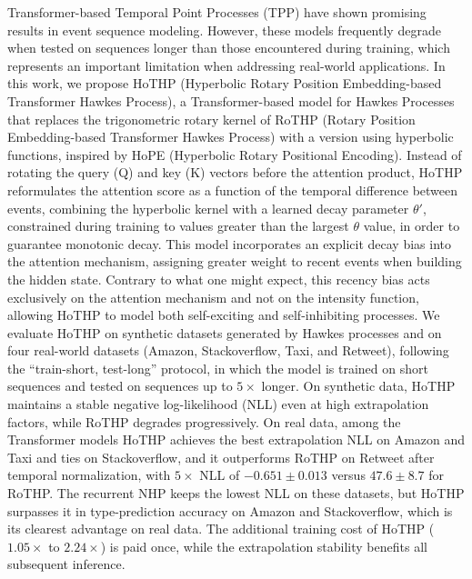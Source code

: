 Transformer-based Temporal Point Processes (\gls{TPP}) have shown promising results in event sequence modeling. However, these models frequently degrade when tested on sequences longer than those encountered during training, which represents an important limitation when addressing real-world applications. In this work, we propose HoTHP (Hyperbolic Rotary Position Embedding-based Transformer Hawkes Process), a Transformer-based model for Hawkes Processes that replaces the trigonometric rotary kernel of RoTHP (Rotary Position Embedding-based Transformer Hawkes Process) with a version using hyperbolic functions, inspired by HoPE (Hyperbolic Rotary Positional Encoding). Instead of rotating the query (Q) and key (K) vectors before the attention product, HoTHP reformulates the attention score as a function of the temporal difference between events, combining the hyperbolic kernel with a learned decay parameter $\theta'$, constrained during training to values greater than the largest $\theta$ value, in order to guarantee monotonic decay. This model incorporates an explicit decay bias into the attention mechanism, assigning greater weight to recent events when building the hidden state. Contrary to what one might expect, this recency bias acts exclusively on the attention mechanism and not on the intensity function, allowing HoTHP to model both self-exciting and self-inhibiting processes. We evaluate HoTHP on synthetic datasets generated by Hawkes processes and on four real-world datasets (Amazon, Stackoverflow, Taxi, and Retweet), following the ``train-short, test-long'' protocol, in which the model is trained on short sequences and tested on sequences up to $5\times$ longer. On synthetic data, HoTHP maintains a stable negative log-likelihood (\gls{NLL}) even at high extrapolation factors, while RoTHP degrades progressively. On real data, among the Transformer models HoTHP achieves the best extrapolation NLL on Amazon and Taxi and ties on Stackoverflow, and it outperforms RoTHP on Retweet after temporal normalization, with $5\times$ NLL of $-0.651 \pm 0.013$ versus $47.6 \pm 8.7$ for RoTHP. The recurrent NHP keeps the lowest NLL on these datasets, but HoTHP surpasses it in type-prediction accuracy on Amazon and Stackoverflow, which is its clearest advantage on real data. The additional training cost of HoTHP ($1.05\times$ to $2.24\times$) is paid once, while the extrapolation stability benefits all subsequent inference.

